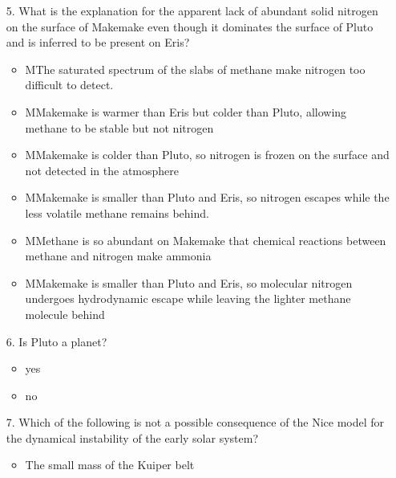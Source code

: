 \begin{enumerate}
\begin{multicols}{2}
\begin{itemize}[label={$\bullet$}]
        \item Kuiper belt objects exist out to at least ~180 AU
        \item Neptune is currently scattering Kuiper belt objects
    \end{itemize}\end{multicols}
    \item[5.] What is the explanation for the apparent lack of abundant solid nitrogen on the surface of Makemake even though it dominates the surface of Pluto and is inferred to be present on Eris?
    \begin{multicols}{2} \begin{itemize}[label={$\bullet$}]
        \item MThe saturated spectrum of the slabs of methane make nitrogen too difficult to detect.
        \item MMakemake is warmer than Eris but colder than Pluto, allowing methane to be stable but not nitrogen
        \item MMakemake is colder than Pluto, so nitrogen is frozen on the surface and not detected in the atmosphere
        \item MMakemake is smaller than Pluto and Eris, so nitrogen escapes while the less volatile methane remains behind.
        \item MMethane is so abundant on Makemake that chemical reactions between methane and nitrogen make ammonia
        \item MMakemake is smaller than Pluto and Eris, so molecular nitrogen undergoes hydrodynamic escape while leaving the lighter methane molecule behind
    \end{itemize}\end{multicols}
    \item[6.] Is Pluto a planet?
    \begin{multicols}{2} \begin{itemize}[label={$\bullet$}]
       \item yes
       \item no
    \end{itemize}\end{multicols}
    \item[7.] Which of the following is not a possible consequence of the Nice model for the dynamical instability of the early solar system? 
    \begin{multicols}{2} \begin{itemize}[label={$\bullet$}]
       \item The small mass of the Kuiper belt

\end{itemize}
\end{multicols}
\end{enumerate}
